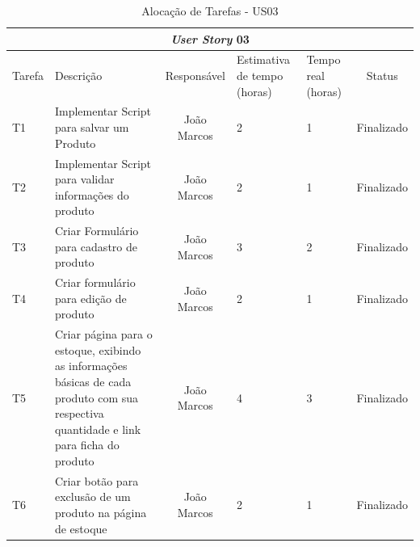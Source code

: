 \documentclass[a4paper,12pt]{monografia}
\begin{document}
\begin{longtable}{|p{1.5cm}|p{3.5cm}|c|p{2cm}|p{2cm}|c|}
\caption{Alocação de Tarefas - US03}
\label{quadro:tat-us03}
\hline
\multicolumn{6}{|c|}{\textbf{\textit{User Story} 03}}\\
\hline		
\rowcolor{ballblue}
Tarefa & Descrição & Responsável & Estimativa de tempo (horas) & Tempo real (horas) & Status\\
\hline
T1 & Implementar Script para salvar um Produto & João Marcos & 2 & 1 & Finalizado\\
\hline
T2 & Implementar Script para validar informações do produto & João Marcos & 2 & 1 & Finalizado\\
\hline
T3 & Criar Formulário para cadastro de produto & João Marcos & 3 & 2 & Finalizado\\
\hline
T4 & Criar formulário para edição de produto & João Marcos & 2 & 1 & Finalizado\\
\hline
T5 & Criar página para o estoque, exibindo as informações básicas de cada produto com sua respectiva quantidade e link para ficha do produto & João Marcos & 4 & 3 & Finalizado\\
\hline
T6 & Criar botão para exclusão de um produto na página de estoque & João Marcos & 2 & 1 & Finalizado\\
\hline
\end{longtable}
\end{document}
